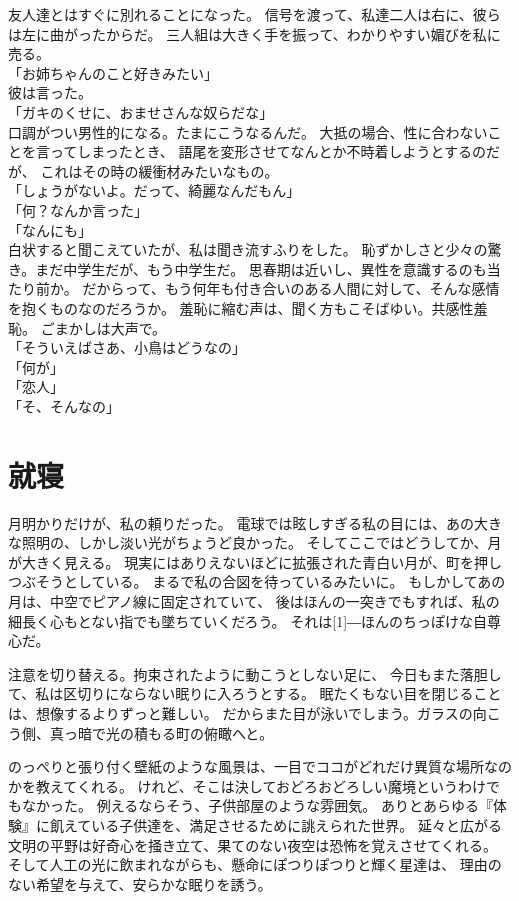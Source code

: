 \documentclass[../HiganMain]{subfiles}
\begin{document}
友人達とはすぐに別れることになった。
信号を渡って、私達二人は右に、彼らは左に曲がったからだ。
三人組は大きく手を振って、わかりやすい媚びを私に売る。\\
「お姉ちゃんのこと好きみたい」\\
彼は言った。\\
「ガキのくせに、おませさんな奴らだな」\\
口調がつい男性的になる。たまにこうなるんだ。
大抵の場合、性に合わないことを言ってしまったとき、
語尾を変形させてなんとか不時着しようとするのだが、
これはその時の緩衝材みたいなもの。\\
「しょうがないよ。だって、綺麗なんだもん」\\
「何？なんか言った」\\
「なんにも」\\
白状すると聞こえていたが、私は聞き流すふりをした。
恥ずかしさと少々の驚き。まだ中学生だが、もう中学生だ。
思春期は近いし、異性を意識するのも当たり前か。
だからって、もう何年も付き合いのある人間に対して、そんな感情を抱くものなのだろうか。
羞恥に縮む声は、聞く方もこそばゆい。共感性羞恥。
ごまかしは大声で。\\
「そういえばさあ、小鳥はどうなの」\\
「何が」\\
「恋人」\\
「そ、そんなの」\\



\section*{就寝}
月明かりだけが、私の頼りだった。
電球では眩しすぎる私の目には、あの大きな照明の、しかし淡い光がちょうど良かった。
そしてここではどうしてか、月が大きく見える。
現実にはありえないほどに拡張された青白い月が、町を押しつぶそうとしている。
まるで私の合図を待っているみたいに。
もしかしてあの月は、中空でピアノ線に固定されていて、
後はほんの一突きでもすれば、私の細長く心もとない指でも墜ちていくだろう。
それは\scalebox{3}[1]{―}ほんのちっぽけな自尊心だ。

注意を切り替える。拘束されたように動こうとしない足に、
今日もまた落胆して、私は区切りにならない眠りに入ろうとする。
眠たくもない目を閉じることは、想像するよりずっと難しい。
だからまた目が泳いでしまう。ガラスの向こう側、真っ暗で光の積もる町の俯瞰へと。

のっぺりと張り付く壁紙のような風景は、一目でココがどれだけ異質な場所なのかを教えてくれる。
けれど、そこは決しておどろおどろしい魔境というわけでもなかった。
例えるならそう、子供部屋のような雰囲気。
ありとあらゆる『体験』に飢えている子供達を、満足させるために誂えられた世界。
延々と広がる文明の平野は好奇心を掻き立て、果てのない夜空は恐怖を覚えさせてくれる。
そして人工の光に飲まれながらも、懸命にぽつりぽつりと輝く星達は、
理由のない希望を与えて、安らかな眠りを誘う。
\end{document}
